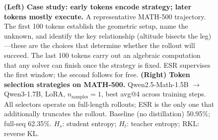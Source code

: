 \documentclass{article}
\newcommand{\method}{ESR}
\newcommand{\Method}{ESR}
\begin{document}
\begin{figure}[t]
\centering
\caption{\textbf{(Left) Case study: early tokens encode strategy; later tokens mostly execute.} A representative MATH-500 trajectory. The first 100 tokens establish the geometric setup, name the unknown, and identify the key relationship (altitude bisects the leg)---these are the choices that determine whether the rollout will succeed. The last 100 tokens carry out an algebraic computation that any solver can finish once the strategy is fixed. \Method{} supervises the first window; the second follows for free. \textbf{(Right) Token selection strategies on MATH-500.} Qwen2.5-Math-1.5B $\to$ Qwen3-1.7B, LoRA, $n_{\text{samples}}{=}1$, best avg@4 across training steps. All selectors operate on full-length rollouts; \method{} is the only one that additionally truncates the rollout. Baseline (no distillation) 50.95\%; full-seq 62.35\%. $H_s$: student entropy; $H_t$: teacher entropy; $\mathrm{RKL}$: reverse KL.}
\label{fig:case_study}\label{tab:token_select}
\begin{minipage}[b]{0.50\textwidth}
    \centering
\end{minipage}
\end{figure}
\end{document}
